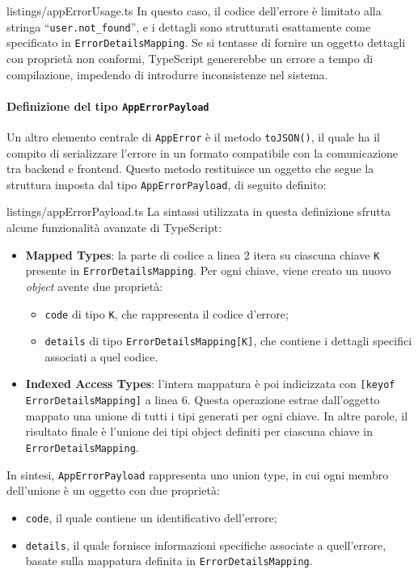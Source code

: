 
{listings/appErrorUsage.ts}
%
In questo caso, il codice dell'errore è limitato alla stringa ``\texttt{user.not\_found}'', e i dettagli sono strutturati esattamente come specificato in \texttt{ErrorDetailsMapping}. Se si tentasse di fornire un oggetto dettagli con proprietà non conformi, TypeScript genererebbe un errore a tempo di compilazione, impedendo di introdurre inconsistenze nel sistema.

\paragraph{Definizione del tipo \texttt{AppErrorPayload}}
Un altro elemento centrale di \texttt{AppError} è il metodo \texttt{toJSON()}, il quale ha il compito di serializzare l’errore in un formato compatibile con la comunicazione tra backend e frontend. Questo metodo restituisce un oggetto che segue la struttura imposta dal tipo \texttt{AppErrorPayload}, di seguito definito:


{listings/appErrorPayload.ts}
%
La sintassi utilizzata in questa definizione sfrutta alcune funzionalità avanzate di TypeScript:
\begin{itemize}
  \item \textbf{Mapped Types}: la parte di codice a linea 2 itera su ciascuna chiave \texttt{K} presente in \texttt{ErrorDetailsMapping}. Per ogni chiave, viene creato un nuovo \textit{object} avente due proprietà:
    \begin{itemize}
      \item \texttt{code} di tipo \texttt{K}, che rappresenta il codice d’errore;
      \item \texttt{details} di tipo \texttt{ErrorDetailsMapping[K]}, che contiene i dettagli specifici associati a quel codice.
    \end{itemize}

  \item \textbf{Indexed Access Types}: l'intera mappatura è poi indicizzata con \texttt{[keyof ErrorDetailsMapping]} a linea 6. Questa operazione estrae dall'oggetto mappato una unione di tutti i tipi generati per ogni chiave. In altre parole, il risultato finale è l'unione dei tipi object definiti per ciascuna chiave in \texttt{ErrorDetailsMapping}.
\end{itemize}
%
In sintesi, \texttt{AppErrorPayload} rappresenta uno union type, in cui ogni membro dell'unione è un oggetto con due proprietà:
\begin{itemize}
  \item \texttt{code}, il quale contiene un identificativo dell'errore;
  \item \texttt{details}, il quale fornisce informazioni specifiche associate a quell'errore, basate sulla mappatura definita in \texttt{ErrorDetailsMapping}.
\end{itemize}

